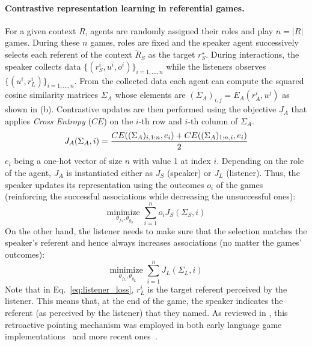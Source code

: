 \paragraph{Contrastive representation learning in referential games. } 
For a given context $R$, agents are randomly assigned their roles and play $n=|R|$ games. During these $n$ games, roles are fixed and the speaker agent successively selects each referent of the context $\tilde{R}_S$ as the target $r^\star_S$. During interactions, the speaker collects data $\{(r_S^i, u^i, o^i)\}_{i=1,...,n}$ while the listeners observes $\{(u^i, r_L^i)\}_{i=1,...,n}$. From the collected data each agent can compute the squared cosine similarity matrices $\Sigma_A$ whose elements are $(\Sigma_A)_{i,j} = E_A(r_A^i, u^j)$ as shown in (b). Contrastive updates are then performed using the objective $J_A$ that applies \textit{Cross Entropy} ($CE$) on the $i$-th row and $i$-th column of $\Sigma_A$.
\begin{equation}
\small
        J_A(\Sigma_A,i) = \frac{CE((\Sigma_A)_{i,1:n},e_i) + CE((\Sigma_A)_{1:n,i},e_i)}{2}\\    
\end{equation}
$e_i$ being a one-hot vector of size $n$ with value 1 at index $i$. Depending on the role of the agent, $J_A$ is instantiated either as $J_S$ (speaker) or $J_L$ (listener). Thus, the speaker updates its representation using the outcomes $o_i$ of the games (reinforcing the successful associations while decreasing the unsuccessful ones):
\begin{equation}
        \underset{\theta_{f_S}, \theta_{g_S}}{\textrm{minimize } } \overset{n}{\underset{i = 1}{\sum}} o_i  J_S(\Sigma_S,i)
\end{equation}
On the other hand, the listener needs to make sure that the selection matches the speaker's referent
\citep{steels2015talkingheads} and hence always increases associations (no matter the games' outcomes):
\begin{equation}
    \underset{\theta_{f_L}, \theta_{g_L}}{\textrm{minimize } } \overset{n}{\underset{i = 1}{\sum}} J_L(\Sigma_L,i)
    \label{eq:listener_loss}
\end{equation}
Note that in Eq.~\ref{eq:listener_loss}, $r_L^i$ is the target referent perceived by the listener. This means that, at the end of the game, the speaker indicates the referent (as perceived by the listener) that they named. As reviewed in , this retroactive pointing mechanism was employed in both early language game implementations~\citep{steels1995self} and more recent ones~\citep{lazaridou2017multiagent,chaabouni2020compositionality,portelance2021emergence}.


